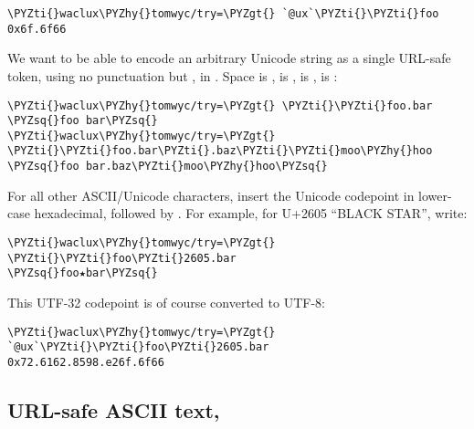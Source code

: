 \begin{framed_shaded}
\begin{Verbatim}[fontsize=\relsize{-2.5},fontseries=b,commandchars=\\\{\}]
\PYZti{}waclux\PYZhy{}tomwyc/try=\PYZgt{} `@ux`\PYZti{}\PYZti{}foo
0x6f.6f66
\end{Verbatim}
\end{framed_shaded}
We want to be able to encode an arbitrary Unicode string as a
single URL-safe token, using no punctuation but , in .
Space is ,  is , \kode{\sig } is \kode{\sig \sig }, \kode{-} is \kode{-}:

\begin{framed_shaded}
\begin{Verbatim}[fontsize=\relsize{-2.5},fontseries=b,commandchars=\\\{\}]
\PYZti{}waclux\PYZhy{}tomwyc/try=\PYZgt{} \PYZti{}\PYZti{}foo.bar
\PYZsq{}foo bar\PYZsq{}
\PYZti{}waclux\PYZhy{}tomwyc/try=\PYZgt{} \PYZti{}\PYZti{}foo.bar\PYZti{}.baz\PYZti{}\PYZti{}moo\PYZhy{}hoo
\PYZsq{}foo bar.baz\PYZti{}moo\PYZhy{}hoo\PYZsq{}
\end{Verbatim}
\end{framed_shaded}
For all other ASCII/Unicode characters, insert the Unicode
codepoint in lower-case hexadecimal, followed by .  For
example, for U+2605 ``BLACK STAR'', write:

\begin{framed_shaded}
\begin{Verbatim}[fontsize=\relsize{-2.5},fontseries=b,commandchars=\\\{\}]
\PYZti{}waclux\PYZhy{}tomwyc/try=\PYZgt{} \PYZti{}\PYZti{}foo\PYZti{}2605.bar
\PYZsq{}foo★bar\PYZsq{}
\end{Verbatim}
\end{framed_shaded}
This UTF-32 codepoint is of course converted to UTF-8:

\begin{framed_shaded}
\begin{Verbatim}[fontsize=\relsize{-2.5},fontseries=b,commandchars=\\\{\}]
\PYZti{}waclux\PYZhy{}tomwyc/try=\PYZgt{} `@ux`\PYZti{}\PYZti{}foo\PYZti{}2605.bar
0x72.6162.8598.e26f.6f66
\end{Verbatim}
\end{framed_shaded}

\subsection{URL-safe ASCII text, }


